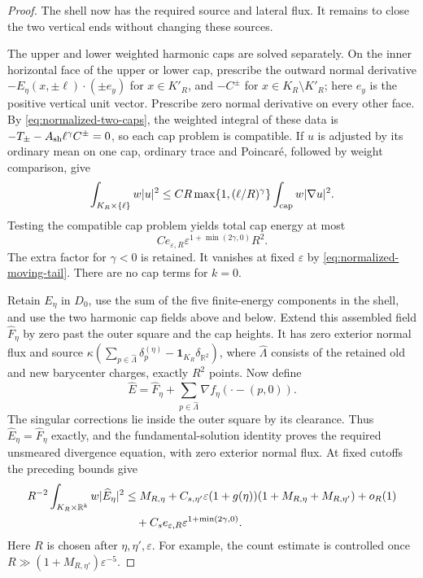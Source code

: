 \begin{proof}
The shell now has the required source and lateral flux. It remains to close
the two vertical ends without changing these sources.

The upper and lower weighted harmonic caps are solved separately.
On the inner horizontal face of the upper or lower cap, prescribe the
outward normal derivative $-E_\eta(x,\pm\ell)\cdot(\pm e_y)$ for
$x\in K'_R$, and $-C^\pm$ for $x\in K_R\setminus K'_R$; here $e_y$
is the positive vertical unit vector.  Prescribe zero normal derivative
on every other face.  By \eqref{eq:normalized-two-caps}, the weighted
integral of these data is
$-T_\pm-A_{\rm sh}\ell^\gamma C^\pm=0$, so each cap problem is
compatible.  If $u$ is adjusted by its ordinary mean on one cap,
ordinary trace and Poincar\'e, followed by weight comparison, give
\[
 \int_{K_R\times\{\ell\}}w|u|^2
   \le CR\max\{1,(\ell/R)^\gamma\}
                              \int_{\rm cap}w|\nabla u|^2.
\]
Testing the compatible cap problem yields total cap energy at most
\[
       C e_{\varepsilon,R}
                     \varepsilon^{1+\min(2\gamma,0)}R^2.
\]
The extra factor for $\gamma<0$ is retained.  It vanishes at fixed
$\varepsilon$ by \eqref{eq:normalized-moving-tail}.
There are no cap terms for $k=0$.

Retain $E_\eta$ in $D_0$, use the sum of the five finite-energy
components in the shell, and use the two harmonic cap fields above
and below.  Extend this assembled field $\widehat F_\eta$ by zero past the
outer square and the cap heights.  It has zero exterior normal flux
and source $\kappa(\sum_{p\in\widehat\Lambda}\delta_p^{(\eta)}
-\mathbf1_{K_R}\delta_{\mathbb R^2})$, where
$\widehat\Lambda$ consists of the retained old and new barycenter
charges, exactly $R^2$ points.  Now define
\[
 \widehat E=\widehat F_\eta+
               \sum_{p\in\widehat\Lambda}\nabla f_\eta(\cdot-(p,0)).
\]
The singular corrections lie inside the outer square by its clearance.
Thus $\widehat E_\eta=\widehat F_\eta$ exactly, and the fundamental-solution
identity proves the required unsmeared divergence equation, with
zero exterior normal flux.  At fixed cutoffs the preceding bounds
give
\begin{align}
 R^{-2}\int_{K_R\times\mathbb R^k}w|\widehat E_\eta|^2
 &\le M_{R,\eta}
   +C_{s,\eta'}\varepsilon(1+g(\eta))
                 (1+M_{R,\eta}+M_{R,\eta'})+o_R(1)\notag\\
 &\quad+C_s e_{\varepsilon,R}
                       \varepsilon^{1+\min(2\gamma,0)}.
 \label{eq:normalized-screen-estimate}
\end{align}
Here $R$ is chosen after $\eta,\eta',\varepsilon$.
For example, the count estimate is controlled once $R\gg(1+M_{R,\eta'})\varepsilon^{-5}$.


\end{proof}
